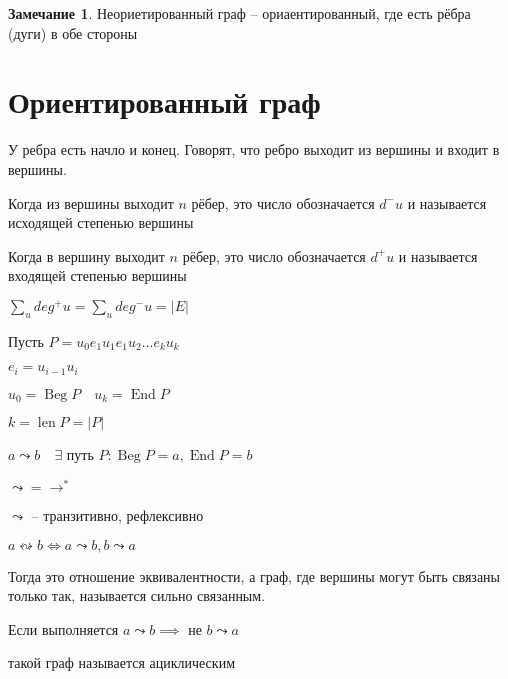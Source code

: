 \documentclass{book}
\theoremstyle{definition}
\newtheorem*{note}{Замечание}
\DeclareMathOperator{\End}{End}
\DeclareMathOperator{\Beg}{Beg}
\DeclareMathOperator{\len}{len}
\begin{document}
    \begin{note}
        Неориетированный граф -- ориаентированный, где есть рёбра (дуги) в обе стороны
    \end{note}

    \section{Ориентированный граф}
    У ребра есть начло и конец. Говорят, что ребро выходит из вершины и входит в вершины.

    Когда из вершины выходит $n$ рёбер, это число обозначается  $d^-u$ и называется исходящей степенью вершины

    Когда в вершину выходит $n$ рёбер, это число обозначается  $d^+u$ и называется входящей степенью вершины

    \begin{lemma}
        $\sum_u deg^+u = \sum_u deg^-u = |E|$
    \end{lemma}
    \begin{definition}
    Пусть $P = u_0 e_1 u_1 e_1 u_2 \ldots e_k u_k$
     
    $e_i = u_{i-1}u_i$

     $u_0 = \Beg P\quad u_k = \End P$

     $k = \len P = |P|$

      $a\leadsto b\quad \exists $ путь $P: \Beg P = a, \End P = b$
    \end{definition}

    \begin{lemma}
        $\leadsto = \to^*$
    \end{lemma}

    \begin{corollary}
        $\leadsto$ -- транзитивно, рефлексивно
    \end{corollary}

    \begin{definition}
        $a\leftrightsquigarrow b \iff a\leadsto b ,  b \leadsto a$

        Тогда это отношение эквивалентности, а граф, где вершины могут быть связаны только так, называется сильно связанным.
    \end{definition}

    \begin{definition}
        Если выполняется $a\leadsto b \implies \text{ не }b\leadsto a$

        такой граф называется ациклическим
    \end{definition}
\end{document}
